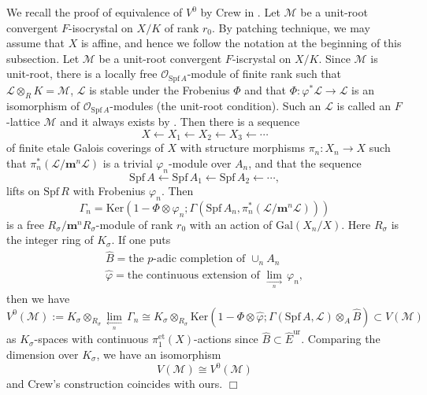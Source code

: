 \documentclass[11pt]{amsart}
\begin{document}
{ {We recall the proof of equivalence of $V^0$ by Crew in \cite[Section 2]{Cr}. 
Let $\mathcal M$ be a unit-root convergent $F$-isocrystal on $X/K$ of rank $r_0$. 
By patching technique, we may assume that $X$ is affine, and hence we follow the notation at the beginning of this 
subsection. 
Let $\mathcal M$ be a unit-root convergent $F$-iscrystal on $X/K$. 
Since $\mathcal M$ is unit-root, 
there is a locally free $\mathcal O_{\mathrm{Spf}\, A}$-module 
of finite rank such that $\mathcal L \otimes_RK = \mathcal M$, 
$\mathcal L$ is stable under the Frobenius $\Phi$ 
and that $\Phi : \varphi^\ast \mathcal L \rightarrow \mathcal L$ 
is an isomorphism of $\mathcal O_{\mathrm{Spf}\, A}$-modules 
(the unit-root condition). 
Such an $\mathcal L$ is called an $F$-lattice $\mathcal M$ and 
it always exists by \cite[Proposition 2.5]{Cr}. 
Then there is a sequence 
$$
     X \leftarrow X_1 \leftarrow X_2 \leftarrow X_3 \leftarrow \cdots
$$
of finite etale Galois coverings of $X$ with structure morphisms $\pi_n : X_n \rightarrow X$ such that 
$\pi^\ast_n(\mathcal L/\mathbf m^n\mathcal L)$ is a trivial $\varphi_n$-module over $A_n$, 
and that the sequence 
$$
     \mathrm{Spf}\, A \leftarrow \mathrm{Spf}\, A_1 \leftarrow \mathrm{Spf}\, A_2 \leftarrow \cdots, 
$$
lifts on $\mathrm{Spf}\, R$ with Frobenius $\varphi_n$. 
Then 
$$
\Gamma_n = \mathrm{Ker}\left(1 - \Phi\otimes \varphi_n; 
\Gamma(\mathrm{Spf}\, A_n, \pi^\ast_n(\mathcal L/\mathbf m^n\mathcal L))\right)
$$ 
is a free $R_\sigma/\mathbf m^nR_\sigma$-module of rank $r_0$ 
with an action of $\mathrm{Gal}(X_n/X)$. 
Here $R_\sigma$ is the integer ring of $K_\sigma$. 
If one puts  
$$
   \begin{array}{l}
     \widehat{B} = \mbox{the $p$-adic completion of}\, \, \cup_n A_n \\
     \widehat\varphi = \mbox{the continuous extension of}\, \, 
     \displaystyle{\mathop{\mathrm{lim}}_{\underset n{\rightarrow}}}\, \varphi_n, 
   \end{array}
$$
then we have 
$$
      V^0(\mathcal M) := K_\sigma \otimes_{R_\sigma} \displaystyle{\mathop{\mathrm{lim}}_{\underset n{\leftarrow}}}\, \Gamma_n 
      \cong K_\sigma \otimes_{R_\sigma} \mathrm{Ker}\left(1 - \Phi \otimes \widehat{\varphi}; 
      \Gamma(\mathrm{Spf}\, A, \mathcal L) \otimes_A\widehat{B} \right) 
      \subset V(\mathcal M)
$$
as $K_\sigma$-spaces with continuous $\pi_1^{\mathrm{et}}(X)$-actions since 
$\widehat{B} \subset \widehat{E}^{\mathrm{ur}}$. 
Comparing the dimension over $K_\sigma$, we have an isomorphism 
$$
V(\mathcal M) \cong V^0(\mathcal M)
$$ 
and Crew's construction coincides with ours. 
} \hspace*{\fill} $\Box$}
\end{document}
